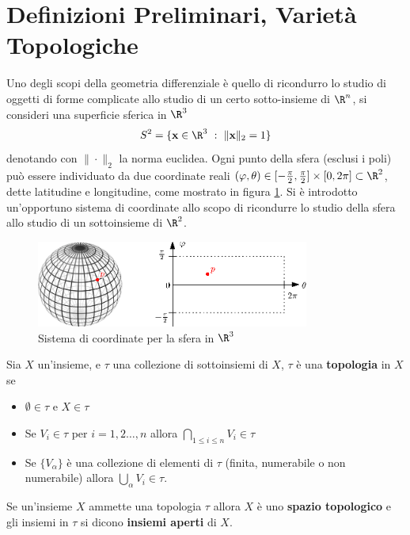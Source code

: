 \documentclass[10pt, letterpaper]{report}
\begin{document}
\section{Definizioni Preliminari, Varietà Topologiche}
Uno degli scopi della geometria differenziale è quello di ricondurro lo studio di oggetti di forme complicate allo studio di un certo sotto-insieme di $\R^n$, si consideri una superficie sferica in $\R^3$
\begin{equation}
    S^{2}=\{\mathbf x\in\R^3 \ : \ \|\mathbf x\|_2=1\}
\end{equation}
denotando con $\|\cdot\|_2$ la norma euclidea. Ogni punto della sfera (esclusi i poli) può essere individuato da due coordinate reali $(\varphi,\theta)\in[-\frac{\pi}{2},\frac{\pi}{2}]\times[0,2\pi]\subset\R^2$, dette latitudine e longitudine, come mostrato in figura \ref{img:sfera}. Si è introdotto un'opportuno sistema di coordinate allo scopo di ricondurre lo studio della sfera allo studio di un sottoinsieme di $\R^2$.
\begin{figure}[h!]
    \center
    \includegraphics[width=0.8\textwidth ]{images/sfera.eps}
    \caption{Sistema di coordinate per la sfera in $\R^3$}
    \label{img:sfera}
\end{figure}
\begin{definizione}
Sia $X$ un'insieme, e $\tau$ una collezione di sottoinsiemi di $X$, $\tau$ è una \textbf{topologia} in $X$ se\begin{itemize}
    \item $\emptyset\in\tau$ e $X\in\tau$
    \item Se $V_i\in\tau$ per $i=1,2\dots,n$ allora $\displaystyle\bigcap_{1\le i\le n}
    V_i\in\tau$
    \item Se $\{V_{\alpha}\}$ è una collezione di elementi di $\tau$ (finita, numerabile o non numerabile) allora $\displaystyle\bigcup_{\alpha}V_i\in\tau$.
\end{itemize}
\end{definizione}
\begin{definizione}
    Se un'insieme $X$ ammette una topologia $\tau$ allora $X$ è uno \textbf{spazio topologico} e gli insiemi in $\tau$ si dicono \textbf{insiemi aperti} di $X$.
\end{definizione}
\end{document}
